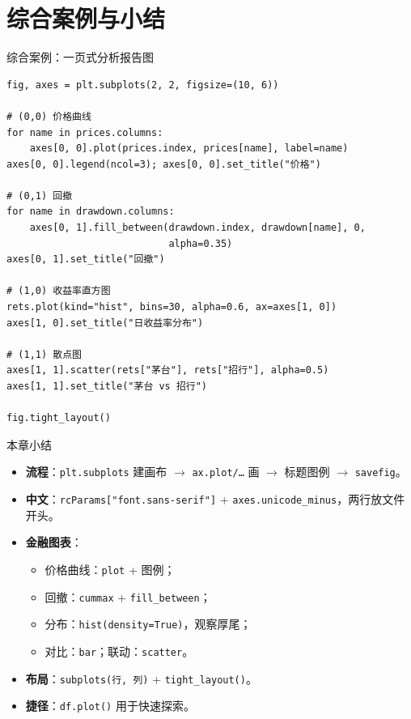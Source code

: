 \documentclass[9pt]{ctexbeamer}
\begin{document}
\section{综合案例与小结}

\begin{frame}[fragile]{综合案例：一页式分析报告图}
	\begin{lstlisting}
fig, axes = plt.subplots(2, 2, figsize=(10, 6))

# (0,0) 价格曲线
for name in prices.columns:
    axes[0, 0].plot(prices.index, prices[name], label=name)
axes[0, 0].legend(ncol=3); axes[0, 0].set_title("价格")

# (0,1) 回撤
for name in drawdown.columns:
    axes[0, 1].fill_between(drawdown.index, drawdown[name], 0,
                            alpha=0.35)
axes[0, 1].set_title("回撤")

# (1,0) 收益率直方图
rets.plot(kind="hist", bins=30, alpha=0.6, ax=axes[1, 0])
axes[1, 0].set_title("日收益率分布")

# (1,1) 散点图
axes[1, 1].scatter(rets["茅台"], rets["招行"], alpha=0.5)
axes[1, 1].set_title("茅台 vs 招行")

fig.tight_layout()
\end{lstlisting}
\end{frame}

\begin{frame}{本章小结}
	\begin{itemize}
		\item \textbf{流程}：\texttt{plt.subplots} 建画布 $\to$ \texttt{ax.plot/\ldots} 画 $\to$ 标题图例 $\to$ \texttt{savefig}。
		\item \textbf{中文}：\texttt{rcParams["font.sans-serif"]} + \texttt{axes.unicode\_minus}，两行放文件开头。
		\item \textbf{金融图表}：
		\begin{itemize}
			\item 价格曲线：\texttt{plot} + 图例；
			\item 回撤：\texttt{cummax} + \texttt{fill\_between}；
			\item 分布：\texttt{hist(density=True)}，观察厚尾；
			\item 对比：\texttt{bar}；联动：\texttt{scatter}。
		\end{itemize}
		\item \textbf{布局}：\texttt{subplots(行, 列)} + \texttt{tight\_layout()}。
		\item \textbf{捷径}：\texttt{df.plot()} 用于快速探索。
	\end{itemize}
\end{frame}
\end{document}

